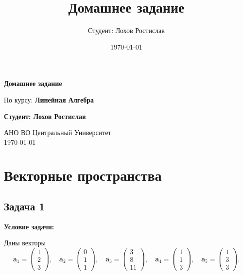 \documentclass[a4paper,12pt]{article}
\title{Домашнее задание}
\author{Студент: Лохов Ростислав}
\date{\today}
\begin{document}
\begin{titlepage}
    \centering
    \vspace*{1cm}

    {\Huge\textbf{Домашнее задание}}

    \vspace{0.5cm}
    {\LARGE По курсу: \textbf{Линейная Алгебра}}

    \vspace{1.5cm}

    \textbf{Студент: Лохов Ростислав}

    \vfill

    {\Large АНО ВО Центральный Университет\\
    \vspace{0.3cm}
    \today}

\end{titlepage}

\tableofcontents
\newpage

\section{Векторные пространства}

\subsection{Задача 1}

\textbf{Условие задачи:}

Даны векторы
\[
\mathbf{a}_1 = \begin{pmatrix}1 \\ 2 \\ 3\end{pmatrix},\quad
\mathbf{a}_2 = \begin{pmatrix}0 \\ 1 \\ 1\end{pmatrix},\quad
\mathbf{a}_3 = \begin{pmatrix}3 \\ 8 \\ 11\end{pmatrix},\quad
\mathbf{a}_4 = \begin{pmatrix}1 \\ 1 \\ 3\end{pmatrix},\quad
\mathbf{a}_5 = \begin{pmatrix}1 \\ 3 \\ 3\end{pmatrix}.
\]
\end{document}
